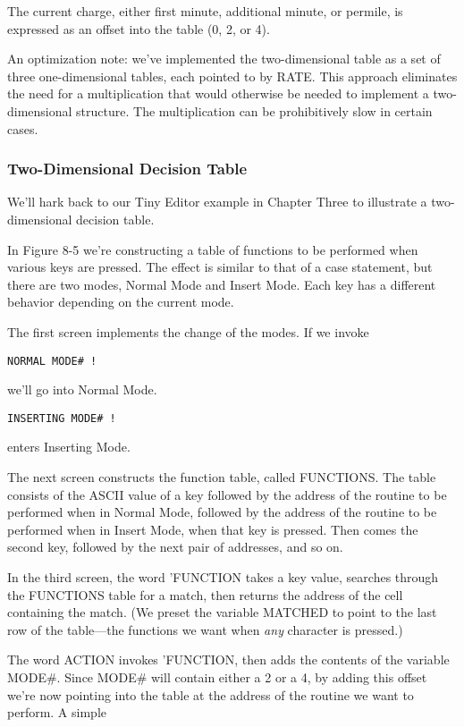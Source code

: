 The current charge, either first minute, additional minute, or permile,
is expressed as an offset into the table (0, 2, or 4).

An optimization note: we've implemented the two-dimensional table
as a set of three one-dimensional tables, each pointed to by RATE. This
approach eliminates the need for a multiplication that would otherwise be
needed to implement a two-dimensional structure. The multiplication can
be prohibitively slow in certain cases.

\subsubsection{Two-Dimensional Decision Table}

We'll hark back to our Tiny Editor example in Chapter Three to illustrate
a two-dimensional decision table.

In Figure 8-5 we're constructing a table of functions to be performed
when various keys are pressed. The effect is similar to that of a
case statement, but there are two modes, Normal Mode and Insert Mode.
Each key has a different behavior depending on the current mode.

The first screen implements the change of the modes. If we invoke

\begin{verbatim}
NORMAL MODE# !
\end{verbatim}

we'll go into Normal Mode.

\begin{verbatim}
INSERTING MODE# !
\end{verbatim}

enters Inserting Mode.

The next screen constructs the function table, called FUNCTIONS.
The table consists of the ASCII value of a key followed by the address of
the routine to be performed when in Normal Mode, followed by the address
of the routine to be performed when in Insert Mode, when that key
is pressed. Then comes the second key, followed by the next pair of
addresses, and so on.

In the third screen, the word 'FUNCTION takes a key value,
searches through the FUNCTIONS table for a match, then returns the
address of the cell containing the match. (We preset the variable
MATCHED to point to the last row of the table---the functions we want
when \emph{any} character is pressed.)

The word ACTION invokes 'FUNCTION, then adds the contents of
the variable MODE#. Since MODE# will contain either a 2 or a 4, by
adding this offset we're now pointing into the table at the address
of the routine we want to perform. A simple

